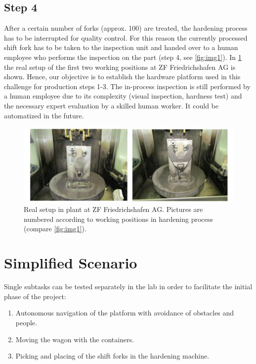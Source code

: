 \documentclass[11pt,english]{AMdocument}
\begin{document}
		\subsection*{Step 4}

After a certain number of forks (approx. 100) are treated, the hardening process has to be interrupted for quality control. For this reason the currently processed shift fork has to be taken to the inspection unit and handed over to a human employee who performs the inspection on the part (step 4, see \cref{fig:img1}). In \cref{fig:img3} the real setup of the first two working positions at ZF Friedrichshafen AG is shown. Hence, our objective is to establish the hardware platform used in this challenge for production steps 1-3. The in-process inspection is still performed by a human employee due to its complexity (visual inspection, hardness test) and the necessary expert evaluation by a skilled human worker. It could be automatized in the future.  

\begin{figure}[h]
	\centering
	\includegraphics[width=\textwidth]{img003}
	\caption{Real setup in plant at ZF Friedrichshafen AG. Pictures are numbered according to working positions in hardening process (compare \cref{fig:img1}).}
	\label{fig:img3}
\end{figure}


	\section*{Simplified Scenario}

Single subtasks can be tested separately in the lab in order to facilitate the initial phase of the project:

\begin{enumerate}[I]
	\item Autonomous navigation of the platform with avoidance of obstacles and people.
	\item Moving the wagon with the containers.
	\item Picking and placing of the shift forks in the hardening machine.
\end{enumerate}
\end{document}
